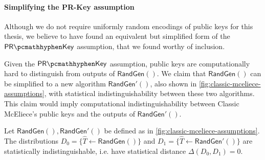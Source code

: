 \paragraph{Simplifying the PR-Key assumption}
Although we do not require uniformly random encodings of public keys for this thesis, we believe to have found an equivalent but simplified form of the $\prkey$ assumption, that we found worthy of inclusion.

Given the $\prkey$ assumption, public keys are computationally hard to distinguish from outputs of $\mathsf{RandGen}()$. We claim that $\mathsf{RandGen}()$ can be simplified to a new algorithm $\mathsf{RandGen}'()$, also shown in \cref{fig:classic-mceliece-assumptions}, with statistical indistinguishability between these two algorithms. This claim would imply computational indistinguishability between Classic McEliece's public keys and the outputs of $\mathsf{RandGen}'()$.

\begin{lemma} \label{lem:classic-mceliece-randgen-prime}
    Let $\mathsf{RandGen}(), \mathsf{RandGen}'()$ be defined as in \cref{fig:classic-mceliece-assumptions}.
    The distributions $D_0 = \{ \hat T \gets \mathsf{RandGen}() \}$ and $D_1 = \{ \hat T \gets \mathsf{RandGen}'() \}$ are statistically indistinguishable, i.e. have statistical distance $\Delta(D_0, D_1) = 0$.
\end{lemma}

